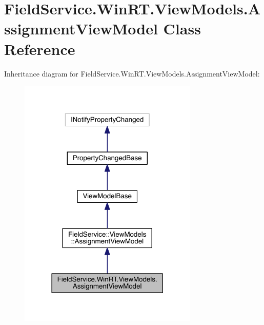 \hypertarget{class_field_service_1_1_win_r_t_1_1_view_models_1_1_assignment_view_model}{\section{Field\+Service.\+Win\+R\+T.\+View\+Models.\+Assignment\+View\+Model Class Reference}
\label{class_field_service_1_1_win_r_t_1_1_view_models_1_1_assignment_view_model}
}


Inheritance diagram for Field\+Service.\+Win\+R\+T.\+View\+Models.\+Assignment\+View\+Model\+:
\nopagebreak
\begin{figure}[H]
\begin{center}
\leavevmode
\includegraphics[width=242pt]{class_field_service_1_1_win_r_t_1_1_view_models_1_1_assignment_view_model__inherit__graph}
\end{center}
\end{figure}


